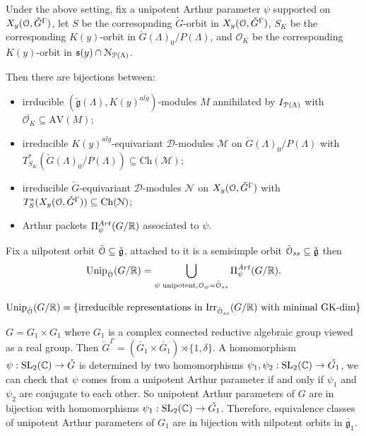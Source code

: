 \documentclass[12pt]{amsart}
\numberwithin{equation}{section}
\newcommand{\fg}{\mathfrak{g}} \newcommand{\fh}{\mathfrak{h}} \newcommand{\fk}{\mathfrak{k}}
\begin{document}
\begin{thm}
  Under the above setting, fix a unipotent Arthur parameter $\psi$ supported on $X_y({\mathcal {O}},\check{G}^{\Gamma})$, let $S$ be the corresopnding $\check{G}$-orbit in $X_y({\mathcal {O}},\check{G}^{\Gamma})$, $S_K$ be the corresponding $K(y)$-orbit in $\check{G}(\Lambda)_0/P(\Lambda)$, and $\mathcal{O}_K$ be the corresponding $K(y)$-orbit in $\mathfrak{s}(y) \cap \mathcal{N}_{{\mathcal {P}}(\Lambda)}$.

  Then there are bijections between:
  \begin{itemize}
    \item irrducible $(\check{\fg}(\Lambda),K(y)^{alg})$-modules $M$ annihilated by $I_{{\mathcal {P}}(\Lambda)}$ with $\overline{\mathcal{O}_K} \subseteq \mathrm{AV}(M)$;
    \item irreducible $K(y)^{alg}$-equivariant $\mathcal{D}$-modules $\mathcal{M}$ on $\check{G}(\Lambda)_0/P(\Lambda)$ with $T^*_{S_K}(\check{G}(\Lambda)_0/P(\Lambda)) \subseteq \mathrm{Ch}(\mathcal{M})$;
    \item irreducible $\check{G}$-equivariant $\mathcal{D}$-modules $\mathcal{N}$ on $X_y({\mathcal {O}},\check{G}^{\Gamma})$ with $T^*_{S}(X_y({\mathcal {O}},\check{G}^{\Gamma})) \subseteq \mathrm{Ch}(\mathcal{N})$;
    \item Arthur packets $\Pi_{\psi}^{Art}(G/{\mathbb {R}})$ associated to $\psi$.
  \end{itemize}
\end{thm}  



\begin{cor}
  Fix a nilpotent orbit $\check{\CO} \subseteq \check{\fg}$, attached to it is a semisimple orbit $\check{\CO}_{ss} \subseteq \check{\fg}$ then
  \[   
    \mathrm{Unip}_{\check{{\mathcal {O}}}}(G/{\mathbb {R}}) = \bigcup_{\psi \textrm{ unipotent}, {\mathcal {O}}_{\psi} = \check{{\mathcal {O}}}_{ss}} \Pi_{\psi}^{Art}(G/{\mathbb {R}}).
  \]
\end{cor}

\begin{rk}
  \[\mathrm{Unip}_{\check{{\mathcal {O}}}}(G/{\mathbb {R}}) = \{ \text{irreducible representations in $\mathrm{Irr}_{\check{{\mathcal {O}}}_{ss}}( G/{\mathbb {R}})$ with minimal GK-dim} \}\]
\end{rk}

\begin{examp}
  $G = G_1 \times G_1$ where $G_1$ is a complex connected reductive algebraic group viewed as a real group. Then $\check{G}^{\Gamma} = (\check{G_1} \times \check{G_1}) \rtimes \{1,\delta\}$. A homomorphism $\psi : {\mathrm{SL}}_2({\mathbb {C}}) \to \check{G}$ is determined by two homomorphisms $\psi_1, \psi_2 : {\mathrm{SL}}_2({\mathbb {C}}) \to \check{G_1}$, we can check that $\psi$ comes from a unipotent Arthur parameter if and only if $\psi_1$ and $\psi_2$ are conjugate to each other. So unipotent Arthur parameters of $G$ are in bijection with homomorphisms $\psi_1 : {\mathrm{SL}}_2({\mathbb {C}}) \to \check{G_1}$. Therefore, equivalence classes of unipotent Arthur parameters of $G_1$ are in bijection with nilpotent orbits in $\check{\fg_1}$.
\end{examp}
\end{document}
